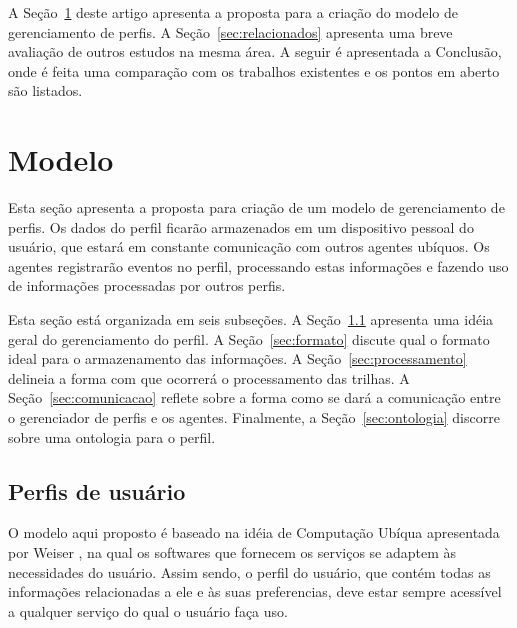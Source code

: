 \documentclass[a4paper, twocolumn]{article}
\begin{document}

A Seção~\ref{sec:modelo} deste artigo apresenta a proposta para a criação do modelo de gerenciamento de perfis. A Seção~\ref{sec:relacionados} apresenta uma breve avaliação de outros estudos na mesma área. A seguir é apresentada a Conclusão, onde é feita uma comparação com os trabalhos existentes e os pontos em aberto são listados.


\section{Modelo} \label{sec:modelo}

Esta seção apresenta a proposta para criação de um modelo de gerenciamento de perfis. Os dados do perfil ficarão armazenados em um dispositivo pessoal do usuário, que estará em constante comunicação com outros agentes ubíquos. Os agentes registrarão eventos no perfil, processando estas informações e fazendo uso de informações processadas por outros perfis.

%

Esta seção está organizada em seis subseções. A Seção~\ref{sec:perfil} apresenta uma idéia geral do gerenciamento do perfil. A Seção~\ref{sec:formato} discute qual o formato ideal para o armazenamento das informações. A Seção~\ref{sec:processamento} delineia a forma com que ocorrerá o processamento das trilhas. A Seção~\ref{sec:comunicacao} reflete sobre a forma como se dará a comunicação entre o gerenciador de perfis e os agentes. Finalmente, a Seção~\ref{sec:ontologia} discorre sobre uma ontologia para o perfil.


\subsection{Perfis de usuário} \label{sec:perfil}

O modelo aqui proposto é baseado na idéia de Computação Ubíqua apresentada por Weiser \cite{weiser91}, na qual os softwares que fornecem os serviços se adaptem às necessidades do usuário. Assim sendo, o perfil do usuário, que contém todas as informações relacionadas a ele e às suas preferencias, deve estar sempre acessível a qualquer serviço do qual o usuário faça uso.
\end{document}
